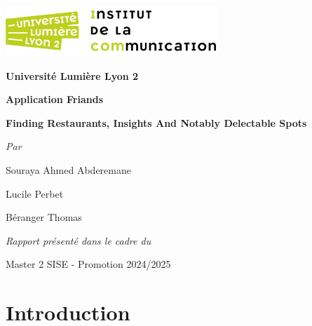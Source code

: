 \documentclass[10pt,french]{report}
\begin{document}
	
	\begin{titlepage}
		\centering
		\includegraphics[width=0.6\textwidth]{icom.png}\par\vspace{0.5cm}
		{\Large\bfseries Université Lumière Lyon 2}\par
		\par\vspace{3.5cm}
		
		
		
		{\Huge\bfseries Application Friands}\par\vspace{0.75cm}
		{\huge\bfseries Finding Restaurants, Insights And Notably Delectable Spots}\par\vspace{0.75cm}
		
		{\Large\itshape }\par\vspace{3.5cm}
		
		{\Large\itshape Par}\par
		{\Large Souraya Ahmed Abderemane}\par
		{\Large Lucile Perbet}\par
		{\Large Béranger Thomas}\par\vspace{1cm}
		
		{\large\itshape Rapport présenté dans le cadre du}\par
		{\large Master 2 SISE - Promotion 2024/2025}\par\vspace{1cm}
		
		\vfill
		
	\end{titlepage}
	
	\tableofcontents
	
	\setlength{\parskip}{12pt}
	
	\begin{abstract}
		Ce rapport détaille l'implémentation d'une application Streamlit destinés aux lyonnais gourmets.
	\end{abstract}
	
	\chapter{Introduction}
	
\end{document}

